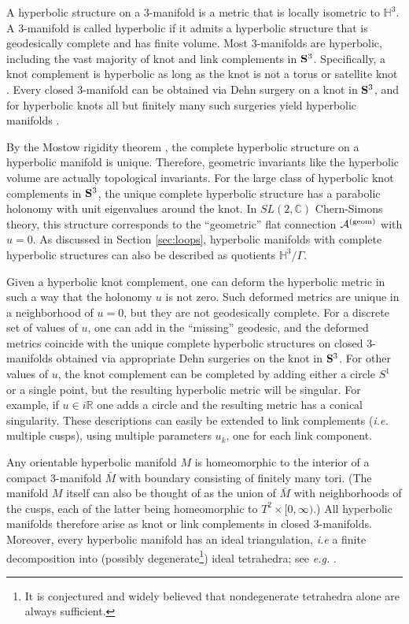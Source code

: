 \documentclass[hyper]{JHEP3}
\def\CA {{\cal A}}
\newcommand{\C}{{\mathbb{C}}}
\newcommand{\R}{{\mathbb{R}}}
\newcommand{\IH}{{\mathbb{H}}}
\begin{document}
A hyperbolic structure on a 3-manifold is a metric that is locally isometric to $\IH^3$.
A 3-manifold is called hyperbolic if it admits a hyperbolic structure that is geodesically complete and has finite volume.
Most 3-manifolds are hyperbolic, including the vast majority
of knot and link complements in ${\bf S}^3$.
Specifically, a knot complement is hyperbolic as long as the knot is not
a torus or satellite knot \cite{thurston-1986}.
Every closed 3-manifold can be obtained via Dehn surgery on
a knot in ${\bf S}^3$, and for hyperbolic knots
all but finitely many such surgeries yield hyperbolic manifolds \cite{thurston-1980}.

By the Mostow rigidity theorem \cite{mostow-1973, prasad-1973},
the complete hyperbolic structure on a hyperbolic manifold is unique. Therefore, geometric invariants like the hyperbolic volume are actually {topological} invariants.
For the large class of hyperbolic knot complements in ${\bf S}^3$,
the unique complete hyperbolic structure has a parabolic holonomy with unit eigenvalues around the knot.
In $SL(2,\C)$ Chern-Simons theory, this structure corresponds to the ``geometric'' flat connection $\CA^{({\rm geom})}$ with $u=0$. As discussed in Section \ref{sec:loops}, hyperbolic manifolds with complete hyperbolic structures can also be described as quotients $
\mathbb{H}^3/\Gamma$.

Given a hyperbolic knot complement, one can deform the hyperbolic metric in such a way that the holonomy $u$ is not zero.
Such deformed 
metrics are unique in a neighborhood of $u=0$, but they are not geodesically complete. 
For a discrete set of values of $u$, one can add in the ``missing'' geodesic, and the deformed metrics coincide
with the unique complete hyperbolic structures on closed 3-manifolds obtained
via appropriate Dehn surgeries on the knot in ${\bf S}^3$. For other values of $u$, the knot complement can be completed by adding either a circle $S^1$ or a single point, but the resulting hyperbolic metric will be singular. For example, if $u\in i\R$ one adds a circle and the resulting metric has a conical singularity. These descriptions can easily be extended to link complements (\emph{i.e.} multiple cusps),
using multiple parameters $u_k$, one for each link component.

Any orientable hyperbolic manifold $M$ is homeomorphic to the interior of a compact 3-manifold $\bar{M}$ with boundary consisting of finitely many tori. (The manifold $M$ itself can also be thought of as the union of $\bar{M}$ with neighborhoods of the cusps, each of the latter being homeomorphic to $T^2\times [0,\infty)$.)
All hyperbolic manifolds therefore arise as knot or link complements in closed 3-manifolds. Moreover, every hyperbolic manifold has an ideal triangulation, {\it i.e} a finite decomposition into (possibly degenerate\footnote{It is conjectured and widely believed that nondegenerate tetrahedra alone are always sufficient.}) ideal tetrahedra; see {\it e.g.} \cite{thurston-1980, petronio-2000}. 
\end{document}
